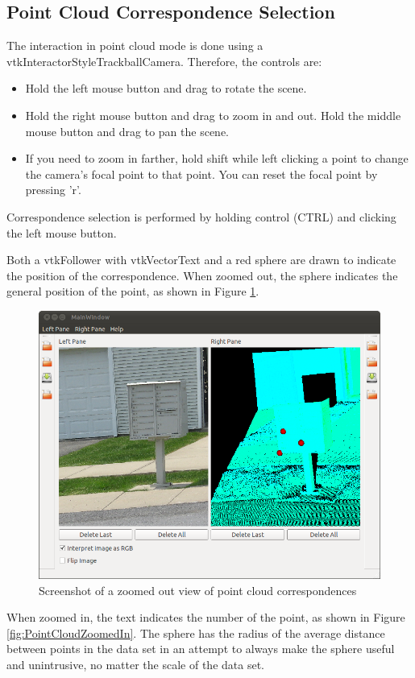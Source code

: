 \documentclass{InsightArticle}
\begin{document}
\subsection{Point Cloud Correspondence Selection}
The interaction in point cloud mode is done using a vtkInteractorStyleTrackballCamera. Therefore, the controls are:
\begin{itemize}
 \item Hold the left mouse button and drag to rotate the scene.
 \item Hold the right mouse button and drag to zoom in and out. Hold the middle mouse button and drag to pan the scene. 
 \item  If you need to zoom in farther, hold shift while left clicking a point to change the camera's focal point to that point. You can reset the focal point by pressing 'r'.
\end{itemize}

Correspondence selection is performed by holding control (CTRL) and clicking the left mouse button.

Both a vtkFollower with vtkVectorText and a red sphere are drawn to indicate the position of the correspondence. When zoomed out, the sphere indicates the general position of the point, as shown in Figure \ref{fig:PointCloudZoomedOut}.

\begin{center}
  \begin{figure}[H]
  \centering
    \includegraphics[width=0.6\linewidth]{images/PointCloudZoomedOut}
    \caption{Screenshot of a zoomed out view of point cloud correspondences}
    \label{fig:PointCloudZoomedOut}
  \end{figure}
\end{center} 

When zoomed in, the text indicates the number of the point, as shown in Figure \ref{fig:PointCloudZoomedIn}. The sphere has the radius of the average distance between points in the data set in an attempt to always make the sphere useful and unintrusive, no matter the scale of the data set.
\end{document}
